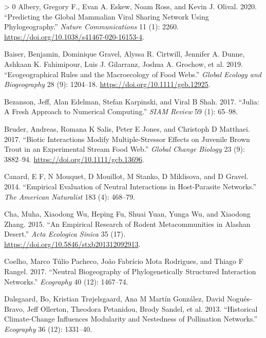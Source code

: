 \documentclass[12pt]{article}
\newlength{\cslhangindent}
\newenvironment{CSLReferences}[3] %
 {%
  \setlength{\parindent}{0pt}
  \ifodd #1 \everypar{\setlength{\hangindent}{\cslhangindent}}\ignorespaces\fi
  \ifnum #2 > 0
  \setlength{\parskip}{#2\baselineskip}
  \fi
 }%
 {}
\begin{document}
\hypertarget{refs}{}
\begin{CSLReferences}{1}{0}
\leavevmode\hypertarget{ref-Albery2020PreGlo}{}%
Albery, Gregory F., Evan A. Eskew, Noam Ross, and Kevin J. Olival. 2020.
{``Predicting the Global Mammalian Viral Sharing Network Using
Phylogeography.''} \emph{Nature Communications} 11 (1): 2260.
\url{https://doi.org/10.1038/s41467-020-16153-4}.

\leavevmode\hypertarget{ref-Baiser2019EcoRul}{}%
Baiser, Benjamin, Dominique Gravel, Alyssa R. Cirtwill, Jennifer A.
Dunne, Ashkaan K. Fahimipour, Luis J. Gilarranz, Joshua A. Grochow, et
al. 2019. {``Ecogeographical Rules and the Macroecology of Food Webs.''}
\emph{Global Ecology and Biogeography} 28 (9): 1204--18.
\url{https://doi.org/10.1111/geb.12925}.

\leavevmode\hypertarget{ref-Bezanson2017JulFre}{}%
Bezanson, Jeff, Alan Edelman, Stefan Karpinski, and Viral B Shah. 2017.
{``Julia: A Fresh Approach to Numerical Computing.''} \emph{SIAM Review}
59 (1): 65--98.

\leavevmode\hypertarget{ref-Bruder2017BioInt}{}%
Bruder, Andreas, Romana K Salis, Peter E Jones, and Christoph D
Matthaei. 2017. {``Biotic Interactions Modify Multiple-Stressor Effects
on Juvenile Brown Trout in an Experimental Stream Food Web.''}
\emph{Global Change Biology} 23 (9): 3882--94.
\url{https://doi.org/10.1111/gcb.13696}.

\leavevmode\hypertarget{ref-Canard2014EmpEva}{}%
Canard, E F, N Mouquet, D Mouillot, M Stanko, D Miklisova, and D Gravel.
2014. {``Empirical Evaluation of Neutral Interactions in Host-Parasite
Networks.''} \emph{The American Naturalist} 183 (4): 468--79.

\leavevmode\hypertarget{ref-CHAMuha2015EmpRes}{}%
Cha, Muha, Xiaodong Wu, Heping Fu, Shuai Yuan, Yunga Wu, and Xiaodong
Zhang. 2015. {``An Empirical Research of Rodent Metacommunities in
Alashan Desert.''} \emph{Acta Ecologica Sinica} 35 (17).
\url{https://doi.org/10.5846/stxb201312092913}.

\leavevmode\hypertarget{ref-Coelho2017NeuBio}{}%
Coelho, Marco Túlio Pacheco, João Fabrício Mota Rodrigues, and Thiago F
Rangel. 2017. {``Neutral Biogeography of Phylogenetically Structured
Interaction Networks.''} \emph{Ecography} 40 (12): 1467--74.

\leavevmode\hypertarget{ref-Dalsgaard2013HisCli}{}%
Dalsgaard, Bo, Kristian Trøjelsgaard, Ana M Martín González, David
Nogués-Bravo, Jeff Ollerton, Theodora Petanidou, Brody Sandel, et al.
2013. {``Historical Climate-Change Influences Modularity and Nestedness
of Pollination Networks.''} \emph{Ecography} 36 (12): 1331--40.


\end{CSLReferences}
\end{document}
